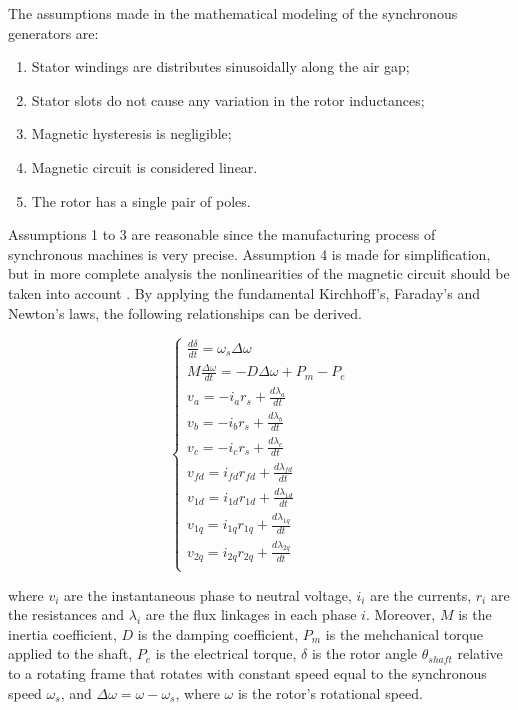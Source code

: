 \newpage
The assumptions made in the mathematical modeling of the synchronous generators are:
\begin{enumerate}
    \item Stator windings are distributes sinusoidally along the air gap;
    \item Stator slots do not cause any variation in the rotor inductances;
    \item Magnetic hysteresis is negligible;
    \item Magnetic circuit is considered linear.
    \item The rotor has a single pair of poles.
\end{enumerate}

Assumptions 1 to 3 are reasonable since the manufacturing process of synchronous
machines is very precise. Assumption 4 is made for simplification, but in more
complete analysis the nonlinearities of the magnetic circuit should be taken
into account \cite{kundur2022power}. By applying the fundamental Kirchhoff's,
Faraday's and Newton's laws, the following relationships can be derived.

\begin{equation}
    \begin{cases}
        \frac{d\delta}{dt} = \omega_s \Delta\omega\\
        M\frac{\Delta\omega}{dt} = -D\Delta\omega + P_m - P_e\\
        v_a = -i_a r_s + \frac{d\lambda_a}{dt}\\
        v_b = -i_b r_s + \frac{d\lambda_b}{dt}\\
        v_c = -i_c r_s + \frac{d\lambda_c}{dt}\\
        v_{fd} = i_{fd}r_{fd} + \frac{d\lambda_{fd}}{dt}\\
        v_{1d} = i_{1d}r_{1d} + \frac{d\lambda_{1d}}{dt}\\
        v_{1q} = i_{1q}r_{1q} + \frac{d\lambda_{1q}}{dt}\\
        v_{2q} = i_{2q}r_{2q} + \frac{d\lambda_{2q}}{dt}\\
    \end{cases}
    \label{eq:gen_eqs_abc}
\end{equation}

\noindent where $v_{i}$ are the instantaneous phase to neutral voltage, $i_i$
are the currents, $r_{i}$ are the resistances and $\lambda_{i}$ are the flux
linkages in each phase $i$. Moreover, $M$ is the inertia coefficient, $D$ is the
damping coefficient, $P_m$ is the mehchanical torque applied to the shaft, $P_e$
is the electrical torque, $\delta$ is the rotor angle $\theta_{shaft}$ relative
to a rotating frame that rotates with constant speed equal to the synchronous
speed $\omega_s$, and $\Delta\omega = \omega - \omega_s$, where $\omega$ is the
rotor's rotational speed.

